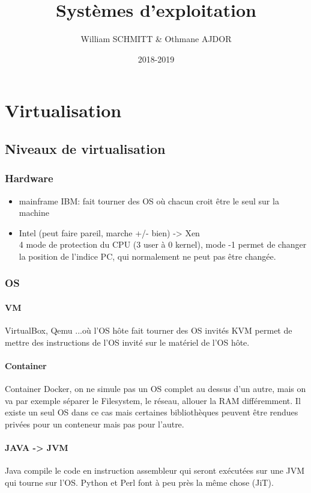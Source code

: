 \documentclass[11pt]{article}
\title{Systèmes d'exploitation}
\author{William SCHMITT \& Othmane AJDOR}
\date{2018-2019}
\begin{document}
\maketitle

\section{Virtualisation}
\subsection{Niveaux de virtualisation}
\subsubsection{Hardware}
\begin{itemize}

	\item mainframe IBM: fait tourner des OS où chacun croit être le seul sur la machine
	\item Intel (peut faire pareil, marche +/- bien) -> Xen\\
	      4 mode de protection du CPU (3 user à 0 kernel), mode -1 permet de changer la position de l'indice PC, qui normalement ne peut pas être changée.
\end{itemize}

\subsubsection{OS}
\paragraph{VM}
VirtualBox, Qemu ...où l'OS hôte fait tourner des OS invités
KVM permet de mettre des instructions de l'OS invité sur le matériel de l'OS hôte.
\paragraph{Container}
Container Docker, on ne simule pas un OS complet au dessus d'un autre, mais on va par exemple séparer le Filesystem, le réseau, allouer la RAM différemment. Il existe un seul OS dans ce cas mais certaines bibliothèques peuvent être rendues privées pour un conteneur mais pas pour l'autre.
\paragraph{JAVA -> JVM}
Java compile le code en instruction assembleur qui seront exécutées sur une JVM qui tourne sur l'OS. Python et Perl font à peu près la même chose (JiT).
\end{document}
